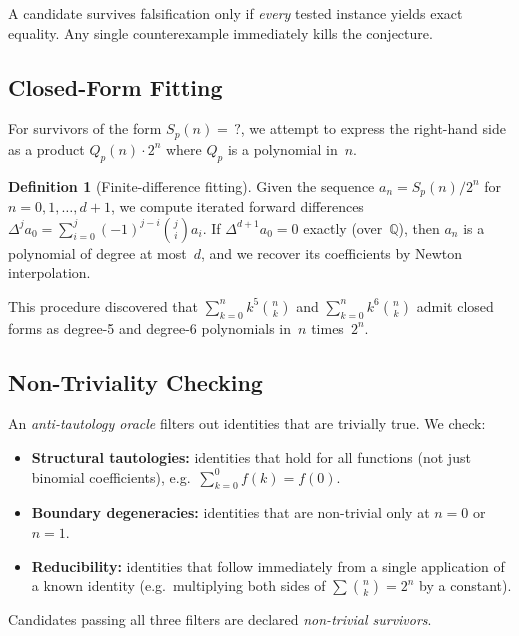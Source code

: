 \documentclass[11pt,a4paper]{article}
\theoremstyle{definition}
\newtheorem{definition}[theorem]{Definition}
\theoremstyle{remark}
\newcommand{\Q}{\mathbb{Q}}
\begin{document}
A candidate survives falsification only if
\emph{every} tested instance yields exact equality.
Any single counterexample immediately kills the conjecture.

\subsection{Closed-Form Fitting}\label{sec:fitting}

For survivors of the form $S_p(n)=\,?$, we attempt to express the
right-hand side as a product $Q_p(n)\cdot 2^n$ where $Q_p$ is a
polynomial in~$n$.

\begin{definition}[Finite-difference fitting]
Given the sequence $a_n = S_p(n)/2^n$ for $n=0,1,\dots,d+1$,
we compute iterated forward differences
$\Delta^j a_0 = \sum_{i=0}^{j}(-1)^{j-i}\binom{j}{i}a_i$.
If $\Delta^{d+1}a_0=0$ exactly (over~$\Q$), then $a_n$ is a polynomial
of degree at most~$d$, and we recover its coefficients by
Newton interpolation.
\end{definition}

This procedure discovered that $\sum_{k=0}^n k^5\binom{n}{k}$ and
$\sum_{k=0}^n k^6\binom{n}{k}$ admit closed forms as
degree-5 and degree-6 polynomials in~$n$ times~$2^n$.

\subsection{Non-Triviality Checking}\label{sec:nontrivial}

An \emph{anti-tautology oracle} filters out identities that are
trivially true.  We check:
\begin{itemize}
  \item \textbf{Structural tautologies:}
        identities that hold for all functions (not just binomial
        coefficients), e.g.\ $\sum_{k=0}^0 f(k)=f(0)$.
  \item \textbf{Boundary degeneracies:}
        identities that are non-trivial only at $n=0$ or $n=1$.
  \item \textbf{Reducibility:}
        identities that follow immediately from a single application
        of a known identity (e.g.\ multiplying both sides of
        $\sum\binom{n}{k}=2^n$ by a constant).
\end{itemize}

Candidates passing all three filters are declared \emph{non-trivial
survivors}.
\end{document}
